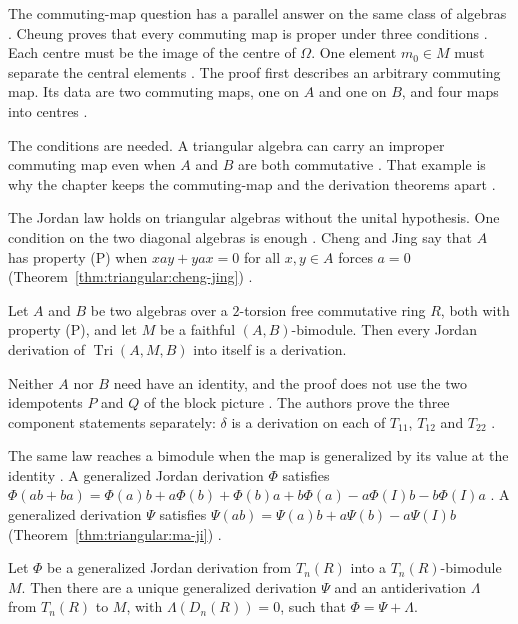 The commuting-map question has a parallel answer on the same class of algebras
\cite[Theorem~2, p.~124]{Cheung2001}. Cheung proves that every commuting map is
proper under three conditions \cite[Theorem~2, p.~124]{Cheung2001}. Each centre
must be the image of the centre of $\Omega$. One element $m_0\in M$ must
separate the central elements \cite[Theorem~2, p.~124]{Cheung2001}. The proof
first describes an arbitrary commuting map. Its data are two commuting maps, one
on $A$ and one on $B$, and four maps into centres
\cite[Proposition~4, p.~121]{Cheung2001}.

The conditions are needed. A triangular algebra can carry an improper commuting
map even when $A$ and $B$ are both commutative
\cite[Example~1, p.~123]{Cheung2001}. That example is why the chapter keeps the
commuting-map and the derivation theorems apart
\cite[Example~1, p.~123]{Cheung2001}.

The Jordan law holds on triangular algebras without the unital hypothesis. One
condition on the two diagonal algebras is enough
\cite[Theorem~2.10, p.~5]{ChengJing2007}. Cheng and Jing say that $A$ has
property (P) when $xay+yax=0$ for all $x,y\in A$ forces $a=0$ (Theorem~\ref{thm:triangular:cheng-jing})
\cite[p.~2]{ChengJing2007}.\begin{theorem}\label{thm:triangular:cheng-jing}
Let $A$ and $B$ be two algebras over a $2$-torsion free commutative ring $R$,
both with property (P), and let $M$ be a faithful $(A,B)$-bimodule. Then every
Jordan derivation of $\operatorname{Tri}(A,M,B)$ into itself is a derivation.
\end{theorem}

Neither $A$ nor $B$ need have an identity, and the proof does not use the two
idempotents $P$ and $Q$ of the block picture \cite[p.~1]{ChengJing2007}. The
authors prove the three component statements separately: $\delta$ is a
derivation on each of $T_{11}$, $T_{12}$ and $T_{22}$
\cite[Lemmas~2.7--2.9, pp.~4--5]{ChengJing2007}.

The same law reaches a bimodule when the map is generalized by its value at the
identity \cite[Theorem~2.4, p.~362]{MaJi2007}. A generalized Jordan derivation
$\Phi$ satisfies
$\Phi(ab+ba)=\Phi(a)b+a\Phi(b)+\Phi(b)a+b\Phi(a)-a\Phi(I)b-b\Phi(I)a$
\cite[p.~355]{MaJi2007}. A generalized derivation $\Psi$ satisfies
$\Psi(ab)=\Psi(a)b+a\Psi(b)-a\Psi(I)b$ (Theorem~\ref{thm:triangular:ma-ji}) \cite[p.~355]{MaJi2007}.

\begin{theorem}\label{thm:triangular:ma-ji}
Let $\Phi$ be a generalized Jordan derivation from $T_n(R)$ into a
$T_n(R)$-bimodule $M$. Then there are a unique generalized derivation $\Psi$ and
an antiderivation $\Lambda$ from $T_n(R)$ to $M$, with
$\Lambda(D_n(R))=0$, such that $\Phi=\Psi+\Lambda$.
\end{theorem}

